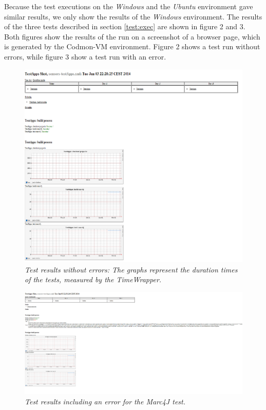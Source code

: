 \documentclass{article}
\newcommand{\project}{Codmon-VM}
\begin{document}
\noindent Because the test executions on the \emph{Windows} and the \emph{Ubuntu} environment gave similar results, we only show the results of the \emph{Windows} environment. The results of the three 
tests described in section \ref{test:exec} are shown in figure 2 and 3. Both figures show the results of the run on a screenshot of a browser page, which is generated by the \project{} 
environment.  Figure 2 shows a test run without errors, while figure 3 show a test run with an error.

\begin{figure}[!ht]
  \centering
    \includegraphics[scale=0.5]{testResultsGood}
\caption{\emph{Test results without errors: The graphs represent the duration times of the tests, measured by the TimeWrapper.}}
\end{figure}


\begin{figure}[!ht]
  \centering
    \includegraphics[scale=0.5]{testResultsError}
  \caption{\emph{Test results including an error for the Marc4J test.}}
\end{figure}
\end{document}
